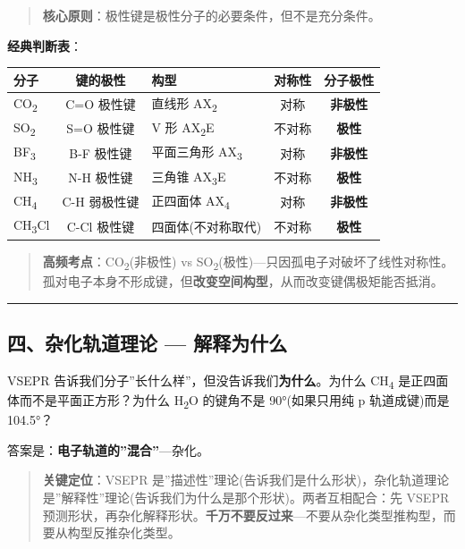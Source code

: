 \documentclass[a4paper,11pt]{ctexart}
\newcounter{none}
\newcommand{\箭}{\ensuremath{\rightarrow}}
\newcommand{\左箭}{\ensuremath{\leftarrow}}
\newcommand{\上箭}{\ensuremath{\uparrow}}
\newcommand{\下箭}{\ensuremath{\downarrow}}
\newcommand{\衡}{\ensuremath{\rightleftharpoons}}
\newcommand{\双箭}{\ensuremath{\leftrightarrow}}
\newcommand{\约等于}{\ensuremath{\approx}}
\newcommand{\小于等于}{\ensuremath{\leq}}
\newcommand{\大于等于}{\ensuremath{\geq}}
\newcommand{\不等于}{\ensuremath{\neq}}
\newcommand{\西格马}{\ensuremath{\sigma}}
\newcommand{\派}{\ensuremath{\pi}}
\begin{document}
\begin{quote}
\textbf{核心原则}：极性键是极性分子的必要条件，但不是充分条件。
\end{quote}

\textbf{经典判断表}：

{\def\LTcaptype{none} %
\begin{longtable}[]{@{}lclcc@{}}
\toprule\noalign{}
分子 & 键的极性 & 构型 & 对称性 & 分子极性 \\
\midrule\noalign{}
\endhead
\bottomrule\noalign{}
\endlastfoot
CO\textsubscript{2} & C=O 极性键 & 直线形 AX\textsubscript{2} & 对称 & \textbf{非极性} \\
SO\textsubscript{2} & S=O 极性键 & V 形 AX\textsubscript{2}E & 不对称 & \textbf{极性} \\
BF\textsubscript{3} & B-F 极性键 & 平面三角形 AX\textsubscript{3} & 对称 & \textbf{非极性} \\
NH\textsubscript{3} & N-H 极性键 & 三角锥 AX\textsubscript{3}E & 不对称 & \textbf{极性} \\
CH\textsubscript{4} & C-H 弱极性键 & 正四面体 AX\textsubscript{4} & 对称 & \textbf{非极性} \\
CH\textsubscript{3}Cl & C-Cl 极性键 & 四面体(不对称取代) & 不对称 & \textbf{极性} \\
\end{longtable}
}

\begin{quote}
\textbf{高频考点}：CO\textsubscript{2}(非极性) vs SO\textsubscript{2}(极性)---只因孤电子对破坏了线性对称性。孤对电子本身不形成键，但\textbf{改变空间构型}，从而改变键偶极矩能否抵消。
\end{quote}

\begin{center}\rule{0.5\linewidth}{0.5pt}\end{center}

\subsection{四、杂化轨道理论 --- 解释为什么}\label{ux56dbux6742ux5316ux8f68ux9053ux7406ux8bba-ux89e3ux91caux4e3aux4ec0ux4e48}

VSEPR 告诉我们分子''长什么样''，但没告诉我们\textbf{为什么}。为什么 CH\textsubscript{4} 是正四面体而不是平面正方形？为什么 H\textsubscript{2}O 的键角不是 90°(如果只用纯 p 轨道成键)而是 104.5°？

答案是：\textbf{电子轨道的''混合''}---杂化。

\begin{quote}
\textbf{关键定位}：VSEPR 是''描述性''理论(告诉我们是什么形状)，杂化轨道理论是''解释性''理论(告诉我们为什么是那个形状)。两者互相配合：先 VSEPR 预测形状，再杂化解释形状。\textbf{千万不要反过来}---不要从杂化类型推构型，而要从构型反推杂化类型。
\end{quote}
\end{document}
